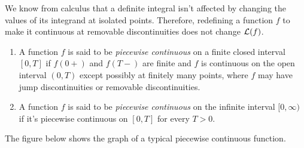 \documentclass{ximera}
\begin{document}
\begin{remark}
We know from calculus that a definite integral isn't
affected by changing the values of its integrand at isolated points.
Therefore, redefining a function $f$ to make it continuous at
removable discontinuities does not change ${\cal L}(f)$.
\end{remark}

\begin{definition}\label{thmtype:8.1.4}

\begin{enumerate}
    \item\label{item:8.1.4a} %
A function $f$ is said to be \textit{piecewise continuous} on a finite
closed interval $[0,T]$ if $f(0+)$ and $f(T-)$ are finite and $f$ is
continuous on the open interval $(0,T)$ except possibly at finitely
many points, where $f$ may have jump discontinuities or removable
discontinuities.
\item\label{item:8.1.4b} %
A function $f$ is said to be \textit{piecewise continuous} on the
infinite interval $[0,\infty)$ if it's piecewise continuous on
$[0,T]$ for every $T>0$.
\end{enumerate}
\end{definition}

The figure below shows the graph of a typical piecewise
continuous function.

\begin{center}
\end{center}
\end{document}
